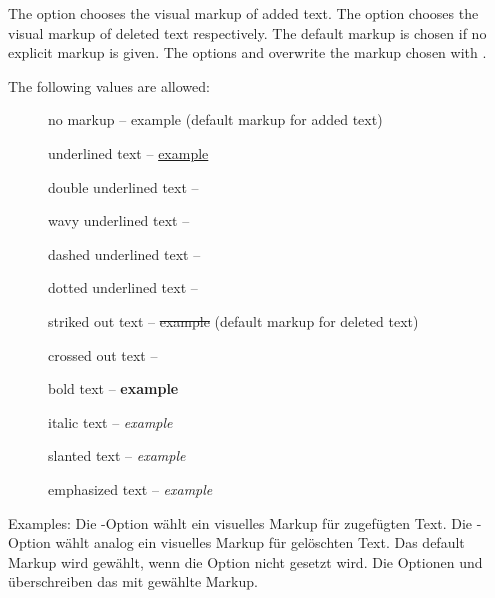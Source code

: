 \ifENGLISH
	The  option chooses the visual markup of added text.
	The  option chooses the visual markup of deleted text respectively.
	The default markup is chosen if no explicit markup is given.
	The options  and  overwrite the markup chosen with .

	The following values are allowed:
	\begin{description}
		\item [] no markup -- example (default markup for added text)
		\item [] underlined text -- \uline{example}
		\item [] double underlined text -- 
		\item [] wavy underlined text -- 
		\item [] dashed underlined text -- 
		\item [] dotted underlined text -- 
		\item [] striked out text -- \sout{example} (default markup for deleted text)
		\item [] crossed out text -- 
		\item [] bold text -- \textbf{example}
		\item [] italic text -- \textit{example}
		\item [] slanted text -- \textsl{example}
		\item [] emphasized text -- \emph{example}
	\end{description}

	Examples:
\fi
	\ifGERMAN
		Die -Option wählt ein visuelles Markup für zugefügten Text.
		Die -Option wählt analog ein visuelles Markup für gelöschten Text.
		Das default Markup wird gewählt, wenn die Option nicht gesetzt wird.
		Die Optionen  und  überschreiben das mit  gewählte Markup.

